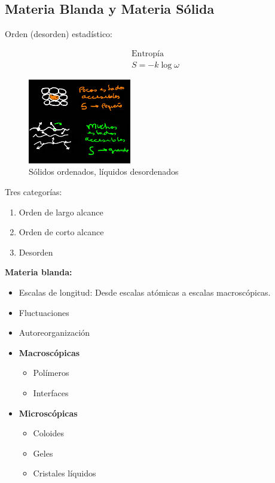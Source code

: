 \subsection{Materia Blanda y Materia Sólida}

Orden (desorden) estadístico:

\begin{align*}
    \text{Entropía}\\
    S=-k\log\omega
\end{align*}

\begin{figure}[H]
    \centering
    \includegraphics[width=0.4\textwidth]{Graficas/Jul27-1.png}
    \caption{Sólidos ordenados, líquidos desordenados}
    \label{fig:SolLiq}
\end{figure}

Tres categorías:

\begin{enumerate}
    \item Orden de largo alcance
    \item Orden de corto alcance
    \item Desorden
\end{enumerate}


\textbf{Materia blanda:}

\begin{itemize}
    \item Escalas de longitud: Desde escalas atómicas a escalas macroscópicas.
    \item Fluctuaciones
    \item Autoreorganización


\item\textbf{Macroscópicas}

\begin{itemize}
    \item Polímeros
    \item Interfaces
\end{itemize}

\item\textbf{Microscópicas}

\begin{itemize}
    \item Coloides
    \item Geles 
    \item Cristales líquidos
\end{itemize}

\end{itemize}

